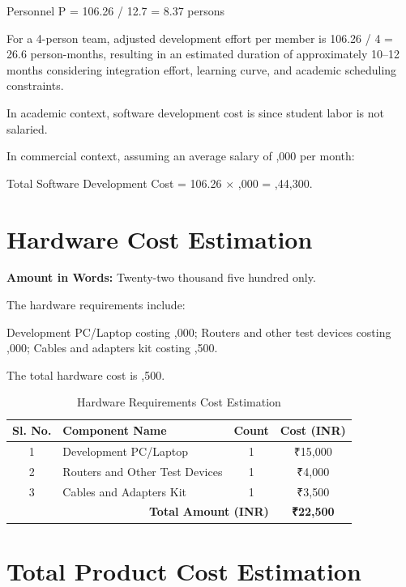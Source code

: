 Personnel P = 106.26 / 12.7 = 8.37 persons  

For a 4-person team, adjusted development effort per member is 106.26 / 4 = 26.6 person-months, resulting in an estimated duration of approximately 10--12 months considering integration effort, learning curve, and academic scheduling constraints.

In academic context, software development cost is  since student labor is not salaried.

In commercial context, assuming an average salary of ,000 per month:

Total Software Development Cost = 106.26 $\times$ ,000 = ,44,300.

\section{Hardware Cost Estimation}

\noindent\textbf{Amount in Words:} Twenty-two thousand five hundred only.

The hardware requirements include:

Development PC/Laptop costing ,000;  
Routers and other test devices costing ,000;  
Cables and adapters kit costing ,500.

The total hardware cost is ,500.

\begin{table}[htbp]
	\centering
	\begin{tabular}{|c|l|c|c|}
		\hline
		\textbf{Sl. No.} & \textbf{Component Name} & \textbf{Count} & \textbf{Cost (INR)} \\
		\hline
		1 & Development PC/Laptop & 1 & ₹15,000 \\
		\hline
		2 & Routers and Other Test Devices & 1 & ₹4,000 \\
		\hline
		3 & Cables and Adapters Kit & 1 & ₹3,500 \\
		\hline
		\multicolumn{3}{|r|}{\textbf{Total Amount (INR)}} & \textbf{₹22,500} \\
		\hline
	\end{tabular}
	\caption{Hardware Requirements Cost Estimation}
	\label{tab:hardware_cost}
\end{table}

\section{Total Product Cost Estimation}

